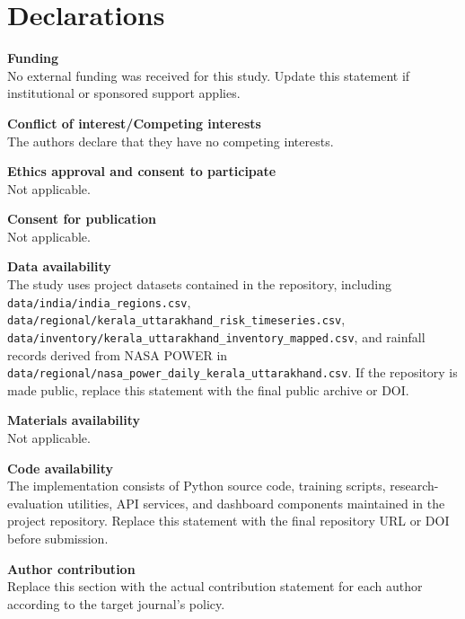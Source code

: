 \documentclass[pdflatex,sn-mathphys-num]{sn-jnl}
\begin{document}
\section*{Declarations}

\textbf{Funding}\\
No external funding was received for this study. Update this statement if institutional or sponsored support applies.

\textbf{Conflict of interest/Competing interests}\\
The authors declare that they have no competing interests.

\textbf{Ethics approval and consent to participate}\\
Not applicable.

\textbf{Consent for publication}\\
Not applicable.

\textbf{Data availability}\\
The study uses project datasets contained in the repository, including \texttt{data/india/india\_regions.csv}, \texttt{data/regional/kerala\_uttarakhand\_risk\_timeseries.csv}, \texttt{data/inventory/kerala\_uttarakhand\_inventory\_mapped.csv}, and rainfall records derived from NASA POWER in \texttt{data/regional/nasa\_power\_daily\_kerala\_uttarakhand.csv}. If the repository is made public, replace this statement with the final public archive or DOI.

\textbf{Materials availability}\\
Not applicable.

\textbf{Code availability}\\
The implementation consists of Python source code, training scripts, research-evaluation utilities, API services, and dashboard components maintained in the project repository. Replace this statement with the final repository URL or DOI before submission.

\textbf{Author contribution}\\
Replace this section with the actual contribution statement for each author according to the target journal's policy.
\end{document}
